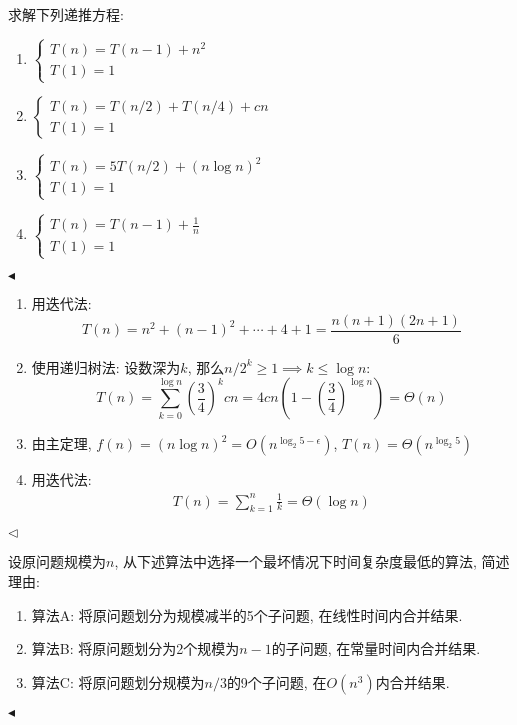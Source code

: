 \documentclass[11pt]{article}
\newenvironment{problem}[2][Problem]{\begin{trivlist}
\item[\hskip \labelsep{\bfseries#1}\hskip\labelsep{\bfseries#2.}]}{\hfill$\blacktriangleleft$\end{trivlist}}
\newenvironment{answer}[1][Answer]{\begin{trivlist}
\item[\hskip \labelsep{\bfseries\itshape#1.}\hskip \labelsep]}{\hfill$\lhd$\end{trivlist}}
\begin{document}
\begin{problem}{2 (Textbook 1.19)}求解下列递推方程:
\begin{enumerate}[label =$(\arabic*)$]
    \item $\begin{cases}
        T(n) = T(n-1) + n^2 \\
        T(1) = 1
    \end{cases}$
    \item
    $ \begin{cases}
        T(n) = T(n/2) + T(n/4) + cn \\
        T(1) = 1
    \end{cases} $
    \item
    $ \begin{cases}
        T(n) = 5 T(n/2) + (n \log n)^2 \\
        T(1) = 1
    \end{cases}$
    \item 
    $ \begin{cases}
        T(n) = T(n - 1) + \frac{1}{n} \\
        T(1) = 1
    \end{cases}$
\end{enumerate}
\end{problem}
\begin{answer}
    \begin{enumerate}[label =$(\arabic*)$]
        \item 用迭代法:
        \[ T(n) = n^2 + (n-1)^2 + \cdots + 4 + 1 = \frac{n(n+1)(2n+1)}{6} \]
        \item 使用递归树法: 设数深为$k$, 那么$n/2^k \ge 1 \implies k \le \log n$:
        \[ T(n) = \sum_{k=0}^{\log n} \left(\frac{3}{4}\right)^k cn = 4cn\left(1-\left(\frac{3}{4}\right)^{\log n}\right) = \Theta(n) \]
        \item 由主定理, $f(n) = (n \log n)^2 = O(n^{\log_2 5 - \epsilon}) $, $T(n) = \Theta(n^{\log_2 5})$
        \item 用迭代法:
        \begin{align*}
            T(n) = \sum_{k = 1}^{n} \frac{1}{k} = \Theta(\log n)
        \end{align*}
    \end{enumerate}
\end{answer}
\begin{problem}{3 (Textbook 1.21)}
    设原问题规模为$n$, 从下述算法中选择一个最坏情况下时间复杂度最低的算法, 简述理由:
    \begin{enumerate}
        \item 算法A: 将原问题划分为规模减半的5个子问题, 在线性时间内合并结果.
        \item 算法B: 将原问题划分为2个规模为$n-1$的子问题, 在常量时间内合并结果.
        \item 算法C: 将原问题划分规模为$n/3$的9个子问题, 在$O(n^3)$内合并结果.
    \end{enumerate}
\end{problem}
\end{document}
